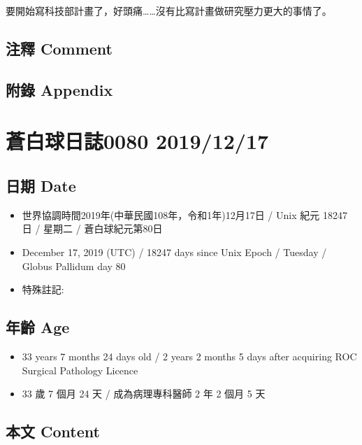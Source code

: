 \documentclass[
]{article}
\providecommand{\tightlist}{%
  \setlength{\itemsep}{0pt}\setlength{\parskip}{0pt}}
\begin{document}
要開始寫科技部計畫了，好頭痛\ldots\ldots 沒有比寫計畫做研究壓力更大的事情了。

\hypertarget{ux6ce8ux91cb-comment-14}{%
\subsection{注釋 Comment}\label{ux6ce8ux91cb-comment-14}}

\hypertarget{ux9644ux9304-appendix-15}{%
\subsection{附錄 Appendix}\label{ux9644ux9304-appendix-15}}

\hypertarget{ux84bcux767dux7403ux65e5ux8a8c0080-20191217}{%
\section{蒼白球日誌0080
2019/12/17}\label{ux84bcux767dux7403ux65e5ux8a8c0080-20191217}}

\hypertarget{ux65e5ux671f-date-16}{%
\subsection{日期 Date}\label{ux65e5ux671f-date-16}}

\begin{itemize}
\tightlist
\item
  世界協調時間2019年(中華民國108年，令和1年)12月17日 / Unix 紀元 18247
  日 / 星期二 / 蒼白球紀元第80日
\item
  December 17, 2019 (UTC) / 18247 days since Unix Epoch / Tuesday /
  Globus Pallidum day 80
\item
  特殊註記:
\end{itemize}

\hypertarget{ux5e74ux9f61-age-16}{%
\subsection{年齡 Age}\label{ux5e74ux9f61-age-16}}

\begin{itemize}
\tightlist
\item
  33 years 7 months 24 days old / 2 years 2 months 5 days after
  acquiring ROC Surgical Pathology Licence
\item
  33 歲 7 個月 24 天 / 成為病理專科醫師 2 年 2 個月 5 天
\end{itemize}

\hypertarget{ux672cux6587-content-16}{%
\subsection{本文 Content}\label{ux672cux6587-content-16}}
\end{document}
